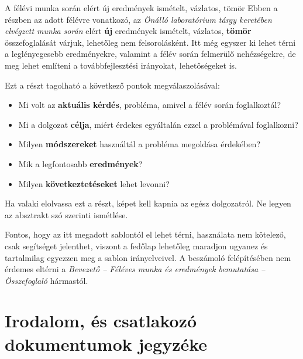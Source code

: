 \documentclass[a4paper,oneside]{article}
\begin{document}
A félévi munka során elért új eredmények ismételt, vázlatos, tömör
Ebben a részben az adott félévre vonatkozó, az \emph{Önálló
  laboratórium tárgy keretében elvégzett munka során} elért
\textbf{új} eredmények ismételt, vázlatos, \textbf{tömör}
összefoglalását várjuk, lehetőleg nem felsorolásként.  Itt még egyszer
ki lehet térni a leglényegesebb eredményekre, valamint a félév során
felmerülő nehézségekre, de meg lehet említeni a továbbfejlesztési
irányokat, lehetőségeket is.

Ezt a részt tagolható a következő pontok megválaszolásával:
\begin{itemize}
\item Mi volt az \textbf{aktuális kérdés}, probléma, amivel a félév
  során foglalkoztál?
\item Mi a dolgozat \textbf{célja}, miért érdekes egyáltalán ezzel a
  problémával foglalkozni?
\item Milyen \textbf{módszereket} használtál a probléma megoldása
  érdekében?
\item Mik a legfontosabb \textbf{eredmények}?
\item Milyen \textbf{következtetéseket} lehet levonni?

\end{itemize}

Ha valaki elolvassa ezt a részt, képet kell kapnia az egész
dolgozatról.  Ne legyen az absztrakt szó szerinti ismétlése.

Fontos, hogy az itt megadott sablontól el lehet térni, használata nem
kötelező, csak segítséget jelenthet, viszont a fedőlap lehetőleg
maradjon ugyanez és tartalmilag egyezzen meg a sablon irányelveivel. A
beszámoló felépítésében nem érdemes eltérni a \emph{Bevezető --
  Féléves munka és eredmények bemutatása -- Összefoglaló} hármastól.

\newpage
 
\section{Irodalom, és csatlakozó dokumentumok jegyzéke}
\label{sec:irod-es-csatl}
\end{document}
